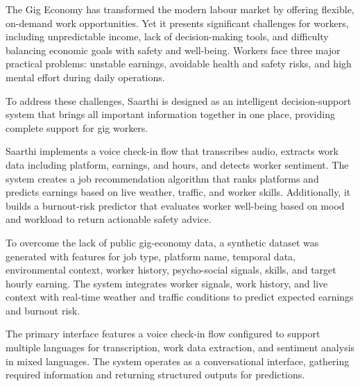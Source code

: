 \documentclass[12pt,a4paper]{article}
\begin{document}
\par\noindent
The Gig Economy has transformed the modern labour market by offering flexible, on-demand work opportunities. Yet it presents significant challenges for workers, including unpredictable income, lack of decision-making tools, and difficulty balancing economic goals with safety and well-being. Workers face three major practical problems: unstable earnings, avoidable health and safety risks, and high mental effort during daily operations.

\vspace{0.5cm}

\par\noindent
To address these challenges, Saarthi is designed as an intelligent decision-support system that brings all important information together in one place, providing complete support for gig workers.

\vspace{0.5cm}

\par\noindent
Saarthi implements a voice check-in flow that transcribes audio, extracts work data including platform, earnings, and hours, and detects worker sentiment. The system creates a job recommendation algorithm that ranks platforms and predicts earnings based on live weather, traffic, and worker skills. Additionally, it builds a burnout-risk predictor that evaluates worker well-being based on mood and workload to return actionable safety advice.

\vspace{0.5cm}

\par\noindent
To overcome the lack of public gig-economy data, a synthetic dataset was generated with features for job type, platform name, temporal data, environmental context, worker history, psycho-social signals, skills, and target hourly earning. The system integrates worker signals, work history, and live context with real-time weather and traffic conditions to predict expected earnings and burnout risk.

\vspace{0.5cm}

\par\noindent
The primary interface features a voice check-in flow configured to support multiple languages for transcription, work data extraction, and sentiment analysis in mixed languages. The system operates as a conversational interface, gathering required information and returning structured outputs for predictions.
\end{document}
